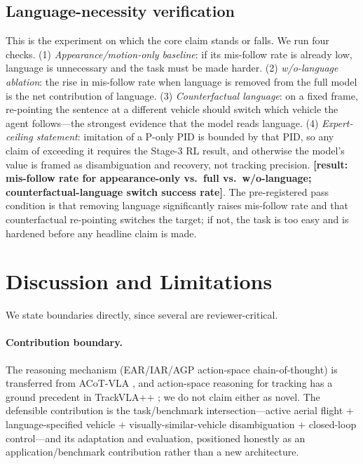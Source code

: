 \documentclass[11pt]{article}
\newcommand{\ph}[1]{{\color{red}\textbf{[#1]}}}
\begin{document}
\subsection{Language-necessity verification}
\label{sec:lang-necessity}
This is the experiment on which the core claim stands or falls. We run four
checks. (1) \emph{Appearance/motion-only baseline}: if its mis-follow rate is
already low, language is unnecessary and the task must be made harder. (2)
\emph{w/o-language ablation}: the rise in mis-follow rate when language is
removed from the full model is the net contribution of language. (3)
\emph{Counterfactual language}: on a fixed frame, re-pointing the sentence at
a different vehicle should switch which vehicle the agent follows---the
strongest evidence that the model reads language. (4) \emph{Expert-ceiling
statement}: imitation of a P-only PID is bounded by that PID, so any claim of
exceeding it requires the Stage-3 RL result, and otherwise the model's value
is framed as disambiguation and recovery, not tracking precision.
\ph{result: mis-follow rate for appearance-only vs.\ full vs.\ w/o-language;
counterfactual-language switch success rate}. The pre-registered pass
condition is that removing language significantly raises mis-follow rate and
that counterfactual re-pointing switches the target; if not, the task is too
easy and is hardened before any headline claim is made.

\section{Discussion and Limitations}
\label{sec:discussion}

We state boundaries directly, since several are reviewer-critical.

\paragraph{Contribution boundary.}
The reasoning mechanism (EAR/IAR/AGP action-space chain-of-thought) is
transferred from ACoT-VLA \citep{acotvla}, and action-space reasoning for
tracking has a ground precedent in TrackVLA++ \citep{trackvlapp}; we do not
claim either as novel. The defensible contribution is the task/benchmark
intersection---active aerial flight $+$ language-specified vehicle $+$
visually-similar-vehicle disambiguation $+$ closed-loop control---and its
adaptation and evaluation, positioned honestly as an application/benchmark
contribution rather than a new architecture.
\end{document}
